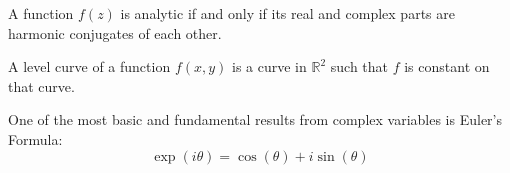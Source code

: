         \begin{theorem}
            A function $f(z)$ is analytic if and only if
            its real and complex parts are harmonic
            conjugates of each other.
        \end{theorem}
        \begin{definition}
            A level curve of a function $f(x,y)$ is
            a curve in $\mathbb{R}^{2}$ such that
            $f$ is constant on that curve.
        \end{definition}
        One of the most basic and fundamental results from
        complex variables is Euler's Formula:
        \begin{equation*}
            \exp(i\theta)=\cos(\theta)+i\sin(\theta)
        \end{equation*}
